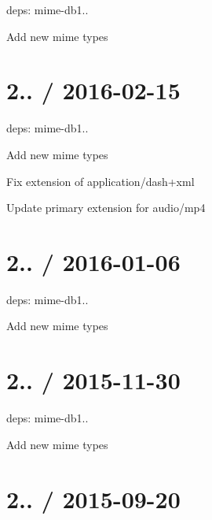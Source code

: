 \begin{DoxyItemize}
\item deps\+: mime-\/db1..
\begin{DoxyItemize}
\item Add new mime types
\end{DoxyItemize}
\end{DoxyItemize}

\section*{2.. / 2016-\/02-\/15 }


\begin{DoxyItemize}
\item deps\+: mime-\/db1..
\begin{DoxyItemize}
\item Add new mime types
\item Fix extension of {\ttfamily application/dash+xml}
\item Update primary extension for {\ttfamily audio/mp4}
\end{DoxyItemize}
\end{DoxyItemize}

\section*{2.. / 2016-\/01-\/06 }


\begin{DoxyItemize}
\item deps\+: mime-\/db1..
\begin{DoxyItemize}
\item Add new mime types
\end{DoxyItemize}
\end{DoxyItemize}

\section*{2.. / 2015-\/11-\/30 }


\begin{DoxyItemize}
\item deps\+: mime-\/db1..
\begin{DoxyItemize}
\item Add new mime types
\end{DoxyItemize}
\end{DoxyItemize}

\section*{2.. / 2015-\/09-\/20 }


